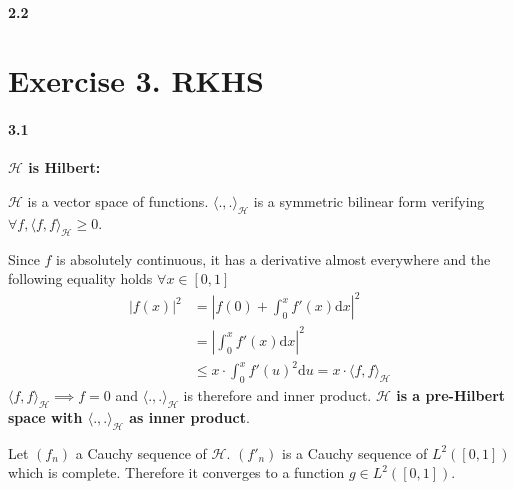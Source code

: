 \documentclass[10pt]{article}
\begin{document}

    \paragraph{2.2}

    \section*{Exercise 3. RKHS}
    \paragraph{3.1} \textbf{ $\mathcal{H}$ is Hilbert: }
    
    $\mathcal{H}$ is a vector space of functions. $\langle ., .
    \rangle_\mathcal{H}$ is a symmetric bilinear form verifying $\forall f, 
    \langle f, f \rangle_\mathcal{H} \geq 0$.
    
    Since $f$ is absolutely continuous, it has a derivative almost everywhere 
    and the following equality holds $\forall x \in [0, 1]$
    \begin{align*}
        |f(x)|^2 &= \left| f(0) + \int_0^x f'(x)\text{d}x \right|^2\\
        &= \left| \int_0^x f'(x)\text{d}x \right|^2 \tag{$f(0) = 0$}\\ 
        &\leq x\cdot\int_0^x f'(u)^2\text{d}u = x \cdot
        \langle f, f \rangle_\mathcal{H}
    \end{align*}
    $\langle f, f \rangle_\mathcal{H} \implies f = 0$ and $\langle ., .
    \rangle_\mathcal{H}$ is therefore and inner product. \textbf{$\mathcal{H}$
    is a pre-Hilbert space with $\langle ., . \rangle_\mathcal{H}$ as inner 
    product}.

    Let $(f_n)$ a Cauchy sequence of $\mathcal{H}$. $(f'_n)$ is a Cauchy 
    sequence of  $L^2([0,1])$ which is complete. Therefore it converges to a 
    function $g \in L^2([0,1])$.
\end{document}
